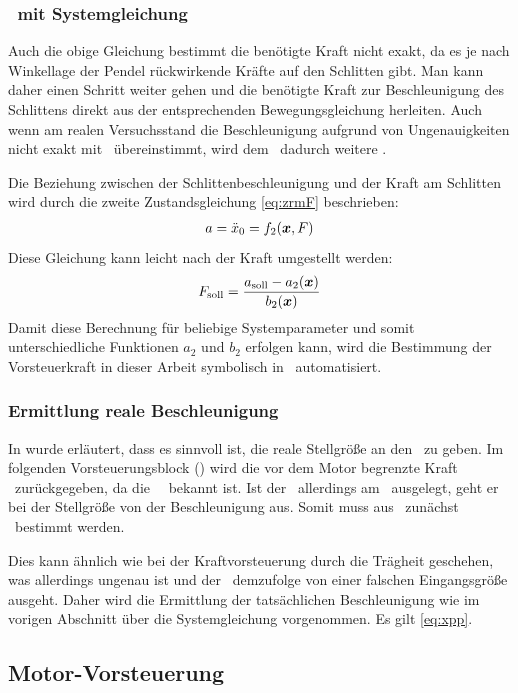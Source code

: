 \subsubsection{\vorst\  mit Systemgleichung}\label{sec:vorstsys}
Auch die obige Gleichung bestimmt die benötigte Kraft nicht exakt, da es je nach Winkellage der Pendel rückwirkende Kräfte auf den Schlitten gibt.
Man kann daher einen Schritt weiter gehen und die benötigte Kraft zur Beschleunigung des Schlittens direkt aus der entsprechenden Bewegungsgleichung herleiten. 
Auch wenn am realen Versuchsstand die Beschleunigung aufgrund von Ungenauigkeiten nicht exakt mit \asoll\ übereinstimmt, wird dem \avr\ dadurch weitere .

Die Beziehung zwischen der Schlittenbeschleunigung und der Kraft am Schlitten wird durch die zweite Zustandsgleichung \eqref{eq:zrmF} beschrieben:
\begin{align}
	a=\ddot{x}_0=f_2(\boldsymbol{x},F)
	\label{eq:xpp}
\end{align}
Diese Gleichung kann leicht nach der Kraft umgestellt werden:
\begin{align}
	F_{\mathrm{soll}}=\frac{a_{\mathrm{soll}}-a_2(\boldsymbol{x})}{b_2(\boldsymbol{x})}
\end{align}
Damit diese Berechnung für beliebige Systemparameter und somit unterschiedliche Funktionen $a_2$ und $b_2$ erfolgen kann, wird die Bestimmung der Vorsteuerkraft in dieser Arbeit symbolisch in \ml\ automatisiert.

\subsubsection{Ermittlung reale Beschleunigung}
In  wurde erläutert, dass es sinnvoll ist, die reale Stellgröße an den \beob\ zu geben.
Im folgenden Vorsteuerungsblock () wird die vor dem Motor begrenzte Kraft \freal\ zurückgegeben, da die \sgb\ \fmax\ bekannt ist.
Ist der \beob\ allerdings am \bss\ ausgelegt, geht er bei der Stellgröße von der Beschleunigung aus.
Somit muss aus \freal\ zunächst \areal\ bestimmt werden.

Dies kann ähnlich wie bei der Kraftvorsteuerung durch die Trägheit geschehen, was allerdings ungenau ist und der \beob\ demzufolge von einer falschen Eingangsgröße ausgeht.
Daher wird die Ermittlung der tatsächlichen Beschleunigung wie im vorigen Abschnitt über die Systemgleichung vorgenommen.
Es gilt \eqref{eq:xpp}.



\subsection{Motor-Vorsteuerung}\label{sec:motvorst}

